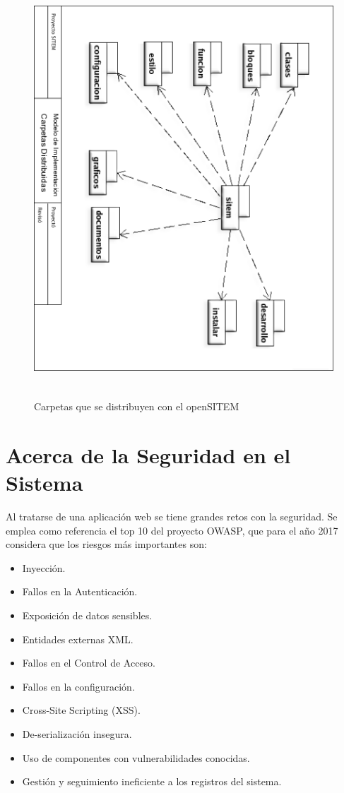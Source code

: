 \begin{figure}
 \centering
 \includegraphics[width=156mm, height=156mm]{carpetas.png}
 \caption{Carpetas que se distribuyen con el openSITEM}
 \label{carpetas_sitem}
\end{figure}

\section{Acerca de la Seguridad en el Sistema}

Al tratarse de una aplicación web se tiene grandes retos con la seguridad. Se emplea como referencia el top 10 del proyecto OWASP\cite{owasp2017}, que para el año 2017 considera que los riesgos más importantes son: 

\begin{itemize}
  \item Inyección.
  \item Fallos en la Autenticación.
  \item Exposición de datos sensibles.
  \item Entidades externas XML.
  \item Fallos en el Control de Acceso.
  \item Fallos en la configuración.
  \item Cross-Site Scripting (XSS).
  \item De-serialización insegura.
  \item Uso de componentes con vulnerabilidades conocidas.
  \item Gestión y seguimiento ineficiente a los registros del sistema.
\end{itemize}

